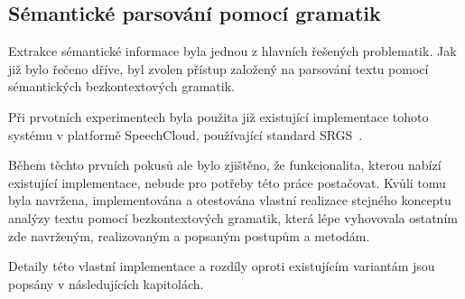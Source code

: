 \subsection{Sémantické parsování pomocí gramatik}\label{subsec:moje_gramatiky}
Extrakce sémantické informace byla jednou z hlavních řešených problematik.
Jak již bylo řečeno dříve, byl zvolen přístup založený na parsování textu pomocí sémantických bezkontextových gramatik.

Při prvotních experimentech byla použita již existující implementace tohoto systému v platformě SpeechCloud, používající standard SRGS~\cite{srgs}.

Během těchto prvních pokusů ale bylo zjištěno, že funkcionalita, kterou nabízí existující implementace,
nebude pro potřeby této práce postačovat.
Kvůli tomu byla navržena, implementována a otestována vlastní realizace stejného konceptu
analýzy textu pomocí bezkontextových gramatik, která lépe vyhovovala ostatním zde navrženým,
realizovaným a popsaným postupům a metodám.

Detaily této vlastní implementace a rozdíly oproti existujícím variantám jsou popsány v následujících kapitolách.

